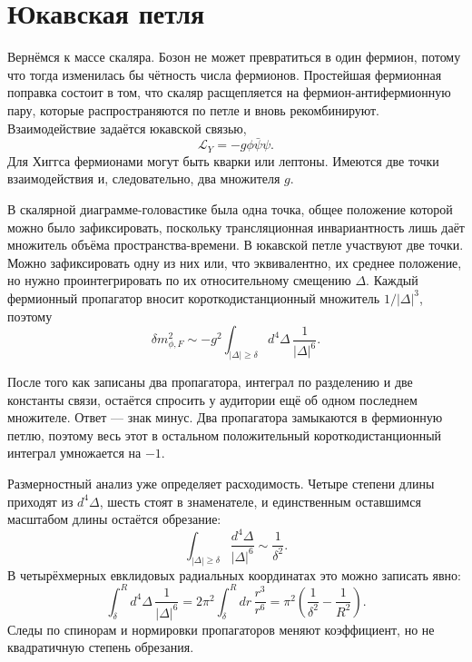 \section{Юкавская петля}

Вернёмся к массе скаляра. Бозон не может превратиться в один фермион, потому что тогда изменилась бы чётность числа фермионов. Простейшая фермионная поправка состоит в том, что скаляр расщепляется на фермион-антифермионную пару, которые распространяются по петле и вновь рекомбинируют. Взаимодействие задаётся юкавской связью,
\begin{equation}
\mathcal L_Y=-g\phi\bar\psi\psi.
\end{equation}
Для Хиггса фермионами могут быть кварки или лептоны. Имеются две точки взаимодействия и, следовательно, два множителя \(g\).

В скалярной диаграмме-головастике была одна точка, общее положение которой можно было зафиксировать, поскольку трансляционная инвариантность лишь даёт множитель объёма пространства-времени. В юкавской петле участвуют две точки. Можно зафиксировать одну из них или, что эквивалентно, их среднее положение, но нужно проинтегрировать по их относительному смещению \(\Delta\). Каждый фермионный пропагатор вносит короткодистанционный множитель \(1/|\Delta|^3\), поэтому
\begin{equation}
\delta m_{\phi,F}^2
\sim
-g^2\int_{|\Delta|\geq\delta}d^4\Delta\,
\frac{1}{|\Delta|^6}.
\end{equation}

После того как записаны два пропагатора, интеграл по разделению и две константы связи, остаётся спросить у аудитории ещё об одном последнем множителе. Ответ — знак минус. Два пропагатора замыкаются в фермионную петлю, поэтому весь этот в остальном положительный короткодистанционный интеграл умножается на \(-1\).

Размерностный анализ уже определяет расходимость. Четыре степени длины приходят из \(d^4\Delta\), шесть стоят в знаменателе, и единственным оставшимся масштабом длины остаётся обрезание:
\begin{equation}
\int_{|\Delta|\geq\delta}
\frac{d^4\Delta}{|\Delta|^6}
\sim\frac{1}{\delta^2}.
\end{equation}
В четырёхмерных евклидовых радиальных координатах это можно записать явно:
\begin{equation}
\int_{\delta}^{R}d^4\Delta\,\frac{1}{|\Delta|^6}
=2\pi^2\int_{\delta}^{R}dr\,\frac{r^3}{r^6}
=\pi^2\left(\frac{1}{\delta^2}-\frac{1}{R^2}\right).
\end{equation}
Следы по спинорам и нормировки пропагаторов меняют коэффициент, но не квадратичную степень обрезания.

